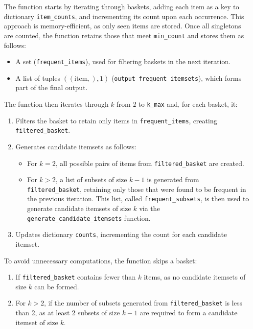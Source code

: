 \documentclass{Class/julia}
\begin{document}
The function starts by iterating through baskets, adding each item as a key to dictionary \texttt{item\_counts}, and incrementing its count upon each occurrence. This approach is memory-efficient, as only seen items are stored. Once all singletons are counted, the function retains those that meet \texttt{min\_count} and stores them as follows:

\begin{itemize}
\item A set (\texttt{frequent\_items}), used for filtering baskets in the next iteration.
\item A list of tuples \(((\text{item},), 1)\) (\texttt{output\_frequent\_itemsets}), which forms part of the final output.
\end{itemize}

The function then iterates through \( k \) from 2 to \texttt{k\_max} and, for each basket, it:

\begin{enumerate}  
\item Filters the basket to retain only items in \texttt{frequent\_items}, creating \texttt{filtered\_basket}.
\item Generates candidate itemsets as follows:
  \begin{itemize}  
  \item For \( k = 2 \), all possible pairs of items from \texttt{filtered\_basket} are created.
  \item For \( k > 2 \), a list of subsets of size \( k-1 \) is generated from \texttt{filtered\_basket}, retaining only those that were found to be frequent in the previous iteration. This list, called \texttt{frequent\_subsets}, is then used to generate candidate itemsets of size \( k \) via the \texttt{generate\_candidate\_itemsets} function.
  \end{itemize}
\item Updates dictionary \texttt{counts}, incrementing the count for each candidate itemset.
\end{enumerate}

\noindent To avoid unnecessary computations, the function skips a basket:
\begin{enumerate}
    \item If \texttt{filtered\_basket} contains fewer than \( k \) items, as no candidate itemsets of size \( k \) can be formed.  
    \item For \( k > 2 \), if the number of subsets generated from \texttt{filtered\_basket} is less than 2, as at least 2 subsets of size \( k-1 \) are required to form a candidate itemset of size \( k \).
\end{enumerate}
\end{document}
